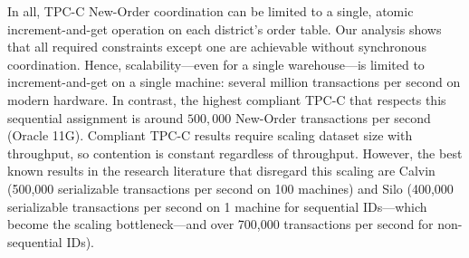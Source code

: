 In all, TPC-C New-Order coordination can be limited to a single,
atomic increment-and-get operation on each district's order table. Our
\cfreedom analysis shows that all required constraints except one are
achievable without synchronous coordination. Hence, scalability---even
for a single warehouse---is limited to increment-and-get on a single
machine: several million transactions per second on modern
hardware. In contrast, the highest compliant TPC-C that respects this
sequential assignment is around $500,000$ New-Order transactions per
second (Oracle 11G). Compliant TPC-C results require scaling dataset
size with throughput, so contention is constant regardless of
throughput. However, the best known results in the research literature
that disregard this scaling are Calvin (500,000 serializable
transactions per second on 100 machines) and Silo (400,000
serializable transactions per second on 1 machine for sequential
IDs---which become the scaling bottleneck---and over 700,000
transactions per second for non-sequential IDs).

